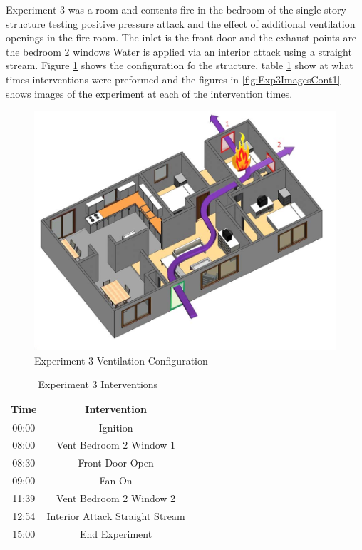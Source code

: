 \documentclass{article}
\begin{document}
Experiment 3 was a room and contents fire in the bedroom of the single story structure testing positive pressure attack and the effect of additional ventilation openings in the fire room. The inlet is the front door and the exhaust points are the bedroom 2 windows Water is applied via an interior attack using a straight stream. Figure \ref{fig:Exp3VentConfig} shows the configuration fo the structure, table \ref{Table:Exp3Interventions} show at what times interventions were preformed and the figures in \ref{fig:Exp3ImagesCont1} shows images of the experiment at each of the intervention times.

 \begin{figure}[h!]
 	\centering
 	\includegraphics[width=5in]{0_Images/FireExperiments/Single_Story/Experiment_3.jpg}
 	\caption{Experiment 3 Ventilation Configuration}
 	\label{fig:Exp3VentConfig}
 \end{figure}

\begin{table}[H]
	\centering
	\caption{Experiment 3 Interventions}
	\begin{tabular}{|c|c|} 
		\hline
		Time & Intervention \\ \hline \hline
		00:00 & Ignition \\ \hline
		08:00 & Vent Bedroom 2 Window 1 \\ \hline
		08:30 & Front Door Open \\ \hline
		09:00 & Fan On \\ \hline
		11:39 & Vent Bedroom 2 Window 2 \\ \hline
		12:54 & Interior Attack Straight Stream \\ \hline
		15:00 & End Experiment \\ \hline
	\end{tabular}
	\label{Table:Exp3Interventions}
\end{table}
\end{document}
